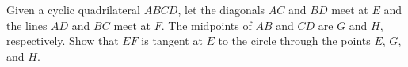 Given a cyclic quadrilateral $ABCD$, let the diagonals $AC$ and $BD$ meet at $E$ and the lines $AD$ and $BC$ meet at $F$. The midpoints of $AB$ and $CD$ are $G$ and $H$, respectively. Show that $EF$ is tangent at $E$ to the circle through the points $E$, $G$, and $H$.
